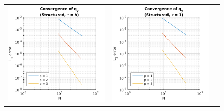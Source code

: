 \documentclass{article}
\begin{document}
\begin{figure}
\begin{tabular}{c c c}
\includegraphics[scale=0.5]{csqy_1.png} & 
\includegraphics[scale=0.5]{csqy_2.png} & 

\end{tabular}
\end{figure}
\end{document}
